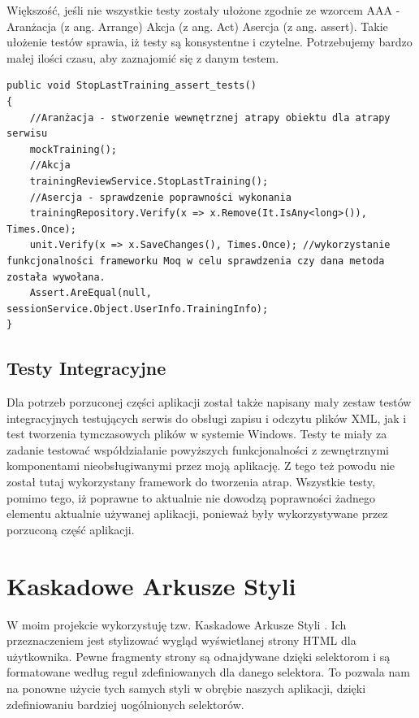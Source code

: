 Większość, jeśli nie wszystkie testy zostały ułożone zgodnie ze wzorcem AAA\cite{UnitTestingMicrosoft} - Aranżacja (z ang. Arrange) Akcja (z ang. Act) Asercja (z ang. assert). Takie ułożenie testów sprawia, iż testy są konsystentne i czytelne. Potrzebujemy bardzo małej ilości czasu, aby zaznajomić się z danym testem.


\begin{lstlisting}[frame=single, numbers=none,captionpos=b, 
caption={Przykładowy test jednostkowy wykorzystujący metodę AAA}]
public void StopLastTraining_assert_tests()
{
	//Aranżacja - stworzenie wewnętrznej atrapy obiektu dla atrapy serwisu
	mockTraining();
	//Akcja
	trainingReviewService.StopLastTraining();
	//Asercja - sprawdzenie poprawności wykonania
	trainingRepository.Verify(x => x.Remove(It.IsAny<long>()), Times.Once);
	unit.Verify(x => x.SaveChanges(), Times.Once); //wykorzystanie funkcjonalności frameworku Moq w celu sprawdzenia czy dana metoda została wywołana.
	Assert.AreEqual(null, sessionService.Object.UserInfo.TrainingInfo);
}
\end{lstlisting}

\section{Testy Integracyjne}
Dla potrzeb porzuconej części aplikacji został także napisany mały zestaw testów integracyjnych testujących serwis do obsługi zapisu i odczytu plików XML, jak i test tworzenia tymczasowych plików w systemie Windows. 
Testy te miały za zadanie testować współdziałanie powyższych funkcjonalności z zewnętrznymi komponentami nieobsługiwanymi przez moją aplikację. Z tego też powodu nie został tutaj wykorzystany framework do tworzenia atrap. Wszystkie testy, pomimo tego, iż poprawne to aktualnie nie dowodzą poprawności żadnego elementu aktualnie używanej aplikacji, ponieważ były wykorzystywane przez porzuconą część aplikacji.



\newpage
{\let\cleardoublepage\relax \chapter{Kaskadowe Arkusze Styli}}

W moim projekcie wykorzystuję tzw. Kaskadowe Arkusze Styli \cite{CSSDoc}. Ich przeznaczeniem jest stylizować wygląd wyświetlanej strony HTML dla użytkownika. Pewne fragmenty strony są odnajdywane dzięki selektorom i są formatowane według reguł zdefiniowanych dla danego selektora. To pozwala nam na ponowne użycie tych samych styli w obrębie naszych aplikacji, dzięki zdefiniowaniu bardziej uogólnionych selektorów.

